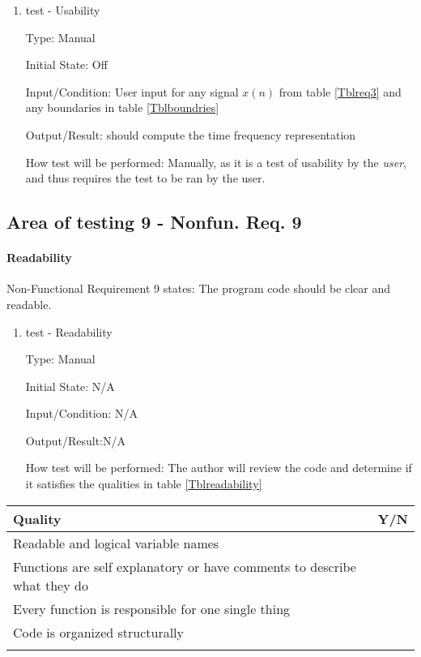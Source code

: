 \documentclass[12pt, titlepage]{article}
\begin{document}
\begin{enumerate}

\item{test - Usability\\}

Type: Manual
					
Initial State: Off
					
Input/Condition: User input for any signal $x(n)$ from table \ref{Tblreq3} and any boundaries in table \ref{Tblboundries}
					
Output/Result: \progname{} should compute the time frequency representation
					
How test will be performed: Manually, as it is a test of usability by the \emph{user}, and thus requires the test to be ran by the user.
					
\end{enumerate}

\subsection{Area of testing 9 - Nonfun. Req. 9} \label{test_readability}
\paragraph{Readability}

Non-Functional Requirement 9 states: The program code should be clear and readable.

\begin{enumerate}

\item{test - Readability\\}

Type: Manual
					
Initial State: N/A
					
Input/Condition: N/A
					
Output/Result:N/A
					
How test will be performed: The author will review the code and determine if it satisfies the qualities in table \ref{Tblreadability}
					
\end{enumerate}
\begin{table}[!h]
  \caption{Code Readability Qualities} \label{Tblreadability}
  \renewcommand{\arraystretch}{1.2}
\noindent \begin{longtable*}{l l} 
  \toprule
  Quality & Y/N\\
  \midrule 
  Readable and logical variable names & \\
  Functions are self explanatory or have comments to describe what they do & \\
  Every function is responsible for one single thing & \\
  Code is organized structurally & \\
\bottomrule \\
\end{longtable*}
\end{table}
\end{document}
